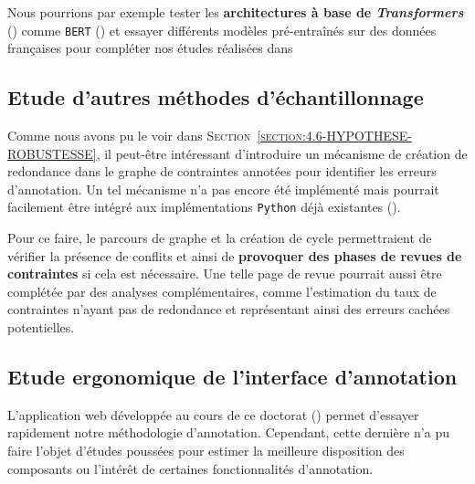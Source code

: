 		Nous pourrions par exemple tester les \textbf{architectures à base de \textit{Transformers}} (\cite{uszkoreit:2017:transformer-novel-neural}) comme \texttt{BERT} (\cite{devlin-etal:2019:bert-pretraining-deep}) et essayer différents modèles pré-entraînés sur des données françaises pour compléter nos études réalisées dans \cite{schild:2021:cognitivefactory-interactiveclusteringcomparativestudy}
	
	
	\subsection{Etude d'autres méthodes d'échantillonnage}
	\label{section:4.7.3-HYPOTHESES-NON-VERIFIEES-ECHANTILLONNAGE}
	
		Comme nous avons pu le voir dans \textsc{Section~\ref{section:4.6-HYPOTHESE-ROBUSTESSE}}, il peut-être intéressant d'introduire un mécanisme de création de redondance dans le graphe de contraintes annotées pour identifier les erreurs d'annotation.
		Un tel mécanisme n'a pas encore été implémenté mais pourrait facilement être intégré aux implémentations \texttt{Python} déjà existantes (\cite{schild:2022:cognitivefactory-interactiveclustering}).
		
		Pour ce faire, le parcours de graphe et la création de cycle permettraient de vérifier la présence de conflits et ainsi de \textbf{provoquer des phases de revues de contraintes} si cela est nécessaire.
		Une telle page de revue pourrait aussi être complétée par des analyses complémentaires, comme l'estimation du taux de contraintes n'ayant pas de redondance et représentant ainsi des erreurs cachées potentielles.
	
	
	\subsection{Etude ergonomique de l'interface d'annotation}
	\label{section:4.7.4-HYPOTHESES-NON-VERIFIEES-ERGONOMIQUE}
	
	L'application web développée au cours de ce doctorat (\cite{schild-etal:2022:cognitivefactory-interactiveclusteringgui}) permet d'essayer rapidement notre méthodologie d'annotation.
	Cependant, cette dernière n'a pu faire l'objet d'études poussées pour estimer la meilleure disposition des composants ou l'intérêt de certaines fonctionnalités d'annotation.
	
